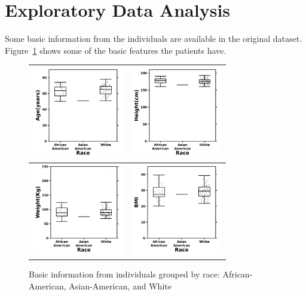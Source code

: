\documentclass[]{article}
\begin{document}
\section{Exploratory Data Analysis}

\noindent Some basic information from the individuals are available in the original dataset. 
Figure~\ref{fig:basic} shows some of the basic features the patients have. \\

\begin{figure}[H]
\centering
\begin{tabular}{|c|c|}
      \hline
      \includegraphics[width=40mm]{png/age.png} &
      \includegraphics[width=40mm]{png/height.png} \\
      \hline
      \includegraphics[width=40mm]{png/weight.png} & 
      \includegraphics[width=40mm]{png/bmi.png} \\
      \hline
\end{tabular}
\caption{Basic information from individuals grouped by race: African-American, Asian-American, and White}
\label{fig:basic}
\end{figure}
\end{document}
